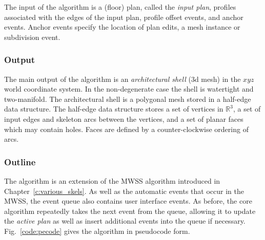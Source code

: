 The input of the algorithm is a (floor) plan, called the \emph{input plan}, profiles associated with the edges of the input plan, profile offset events, and anchor events. Anchor events specify the location of plan edits, a mesh instance or subdivision event.


\subsubsection{Output} The main output of the algorithm is an \emph{architectural shell} (3d mesh) in the $xyz$ world coordinate system. In the non-degenerate case the shell is watertight and two-manifold. The architectural shell is a polygonal mesh stored in a half-edge data structure. The half-edge data structure stores a set of vertices in $\mathbb{R}^3$, a set of input edges and skeleton arcs between the vertices, and a set of planar faces which may contain holes. Faces are defined by a counter-clockwise ordering of arcs.

\subsubsection{Outline} 

The algorithm is an extension of the MWSS algorithm introduced in Chapter~\ref{c:various_skels}. As well as the automatic events that occur in the MWSS, the event queue also contains user interface events. As before, the core algorithm repeatedly takes the next event from the queue, allowing it to update the \emph{active plan} as well as insert additional events into the queue if necessary. Fig.~\ref{code:pecode} gives the algorithm in pseudocode form.

